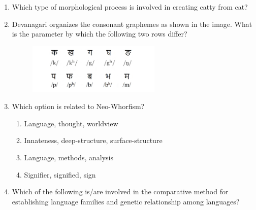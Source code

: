 \documentclass[12pt]{article}
\theoremstyle{remark}
\begin{document}
\begin{enumerate}
\begin{enumerate}
\begin{multicols}{4}
\end{multicols} \end{enumerate}
\hfill{}
\item Which type of morphological process is involved in creating catty from cat?
\begin{enumerate}  \end{enumerate}
\hfill{}
\item Devanagari organizes the consonant graphemes as shown in the image. What is the parameter by which the following two rows differ?
\begin{figure}[H]
\centering
\includegraphics[width=0.6\textwidth]{Figs/Q36.png}
\caption{}
\label{fig:3.4}
\end{figure}
\begin{enumerate}  \end{enumerate}
\hfill{}
\item Which option is related to Neo-Whorfism?
\begin{enumerate} 
\item Language, thought, worldview
\item Innateness, deep-structure, surface-structure
\item Language, methods, analysis
\item Signifier, signified, sign
\end{enumerate}
\hfill{}
\item Which of the following is/are involved in the comparative method for establishing language families and genetic relationship among languages?

\end{enumerate}
\end{document}

